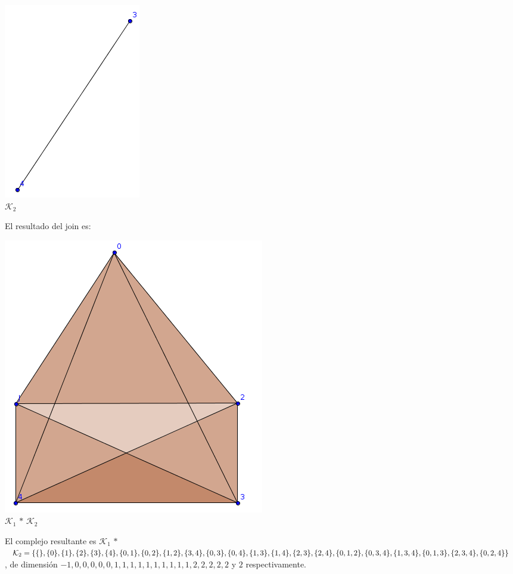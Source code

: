 \documentclass{article}
\begin{document}
\begin{enumerate}
{\begin{itemize}
{        \begin{center}
        \includegraphics[scale=0.4]{entrada3_4b.png}
        \\ $\mathcal{K}_2$
        \end{center}
        El resultado del join es:
        \begin{center}
          \includegraphics[scale=0.4]{salida3_4.png}
          \\  $\mathcal{K}_1$ $*$ $\mathcal{K}_2$
        \end{center}
        El complejo resultante es $\mathcal{K}_1$ $*$ $\mathcal{K}_2 = \{\{\},\{0\},\{1\},\{2\},\{3\},\{4\},\{0,1\},\{0,2\},\{1,2\},\\
        \{3,4\},\{0,3\},\{0,4\},\{1,3\},\{1,4\},\{2,3\},\{2,4\},\{0,1,2\},\{0,3,4\},\{1,3,4\},\{0,1,3\}, \\
        \{2,3,4\},\{0,2,4\}\}$, de dimensión $-1, 0, 0, 0, 0, 0, 1, 1, 1, 1, 1, 1, 1, 1, 1, 1, 2, 2, 2, 2, 2$ y $2$ respectivamente.
      }
    \end{itemize}
  }


\end{enumerate}
\end{document}
